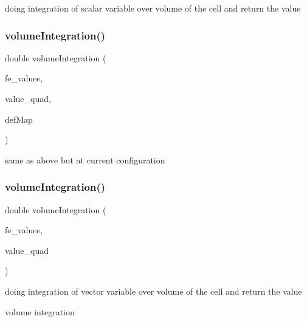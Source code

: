 doing integration of scalar variable over volume of the cell and return the value \mbox{\label{class_residual_ad535764375d2690424b1545898b8a168}} 
\subsubsection{\texorpdfstring{volumeIntegration()}{volumeIntegration()}\hspace{0.1cm}{\footnotesize\ttfamily [2/6]}}
{\footnotesize\ttfamily double volume\+Integration (\begin{DoxyParamCaption}\item[{const F\+E\+Values$<$ dim $>$ \&}]{fe\+\_\+values,  }\item[{double}]{value\+\_\+quad,  }\item[{\mbox{\hyperlink{structdeformation_map}{deformation\+Map}}$<$ T, dim $>$ \&}]{def\+Map }\end{DoxyParamCaption})}

same as above but at current configuration \mbox{\label{class_residual_ab9fdc6a8b102af5beaa1e4eb6fb7fa40}} 
\subsubsection{\texorpdfstring{volumeIntegration()}{volumeIntegration()}\hspace{0.1cm}{\footnotesize\ttfamily [3/6]}}
{\footnotesize\ttfamily double volume\+Integration (\begin{DoxyParamCaption}\item[{const F\+E\+Values$<$ dim $>$ \&}]{fe\+\_\+values,  }\item[{Table$<$ 1, Sacado\+::\+Fad\+::\+D\+Fad$<$ double $>$ $>$ \&}]{value\+\_\+quad }\end{DoxyParamCaption})}

doing integration of vector variable over volume of the cell and return the value

volume integration \mbox{\label{class_residual_a50acc2c1f154889f83606a2b2e2d555c}} 
